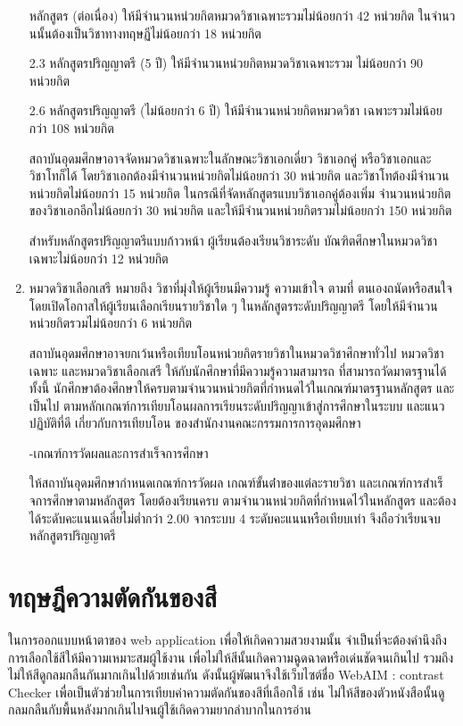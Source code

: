 \begin{enumerate}
    หลักสูตร (ต่อเนื่อง) ให้มีจํานวนหน่วยกิตหมวดวิชาเฉพาะรวมไม่น้อยกว่า 42 หน่วยกิต ในจํานวนนั้นต้องเป็นวิชาทางทฤษฏีไม่น้อยกว่า 18 หน่วยกิต

    2.3	หลักสูตรปริญญาตรี (5 ปี) ให้มีจํานวนหน่วยกิตหมวดวิชาเฉพาะรวม ไม่น้อยกว่า 90 หน่วยกิต

    2.6 หลักสูตรปริญญาตรี (ไม่น้อยกว่า 6 ปี) ให้มีจํานวนหน่วยกิตหมวดวิชา เฉพาะรวมไม่น้อยกว่า 108 หน่วยกิต

    สถาบันอุดมศึกษาอาจจัดหมวดวิชาเฉพาะในลักษณะวิชาเอกเดี่ยว วิชาเอกคู่ หรือวิชาเอกและวิชาโทก็ได้ โดยวิชาเอกต้องมีจํานวนหน่วยกิตไม่น้อยกว่า 30 หน่วยกิต และวิชาโทต้องมีจํานวนหน่วยกิตไม่น้อยกว่า 15 หน่วยกิต ในกรณีที่จัดหลักสูตรแบบวิชาเอกคู่ต้องเพิ่ม จํานวนหน่วยกิตของวิชาเอกอีกไม่น้อยกว่า 30 หน่วยกิต และให้มีจํานวนหน่วยกิตรวมไม่น้อยกว่า 150 หน่วยกิต
		
    สําหรับหลักสูตรปริญญาตรีแบบก้าวหน้า ผู้เรียนต้องเรียนวิชาระดับ บัณฑิตศึกษาในหมวดวิชาเฉพาะไม่น้อยกว่า 12 หน่วยกิต 




    \item หมวดวิชาเลือกเสรี หมายถึง วิชาที่มุ่งให้ผู้เรียนมีความรู้ ความเข้าใจ ตามที่ ตนเองถนัดหรือสนใจ โดยเปิดโอกาสให้ผู้เรียนเลือกเรียนรายวิชาใด ๆ ในหลักสูตรระดับปริญญาตรี โดยให้มีจํานวนหน่วยกิตรวมไม่น้อยกว่า 6 หน่วยกิต
   
    สถาบันอุดมศึกษาอาจยกเว้นหรือเทียบโอนหน่วยกิตรายวิชาในหมวดวิชาศึกษาทั่วไป หมวดวิชาเฉพาะ และหมวดวิชาเลือกเสรี ให้กับนักศึกษาที่มีความรู้ความสามารถ ที่สามารถวัดมาตรฐานได้ ทั้งนี้ นักศึกษาต้องศึกษาให้ครบตามจํานวนหน่วยกิตที่กําหนดไว้ในเกณฑ์มาตรฐานหลักสูตร และเป็นไป ตามหลักเกณฑ์การเทียบโอนผลการเรียนระดับปริญญาเข้าสู่การศึกษาในระบบ และแนวปฏิบัติที่ดี เกี่ยวกับการเทียบโอน ของสํานักงานคณะกรรมการการอุดมศึกษา
  


-เกณฑ์การวัดผลและการสําเร็จการศึกษา

ให้สถาบันอุดมศึกษากําหนดเกณฑ์การวัดผล เกณฑ์ขั้นต่ําของแต่ละรายวิชา และเกณฑ์การสําเร็จการศึกษาตามหลักสูตร โดยต้องเรียนครบ ตามจํานวนหน่วยกิตที่กําหนดไว้ในหลักสูตร และต้องได้ระดับคะแนนเฉลี่ยไม่ตํ่ากว่า 2.00 จากระบบ 4 ระดับคะแนนหรือเทียบเท่า จึงถือว่าเรียนจบหลักสูตรปริญญาตรี 


\end{enumerate}

\section{ทฤษฎีความตัดกันของสี}

ในการออกแบบหน้าตาของ web application เพื่อให้เกิดความสวยงามนั้น จำเป็นที่จะต้องคำนึงถึงการเลือกใช้สีให้มีความเหมาะสมผู้ใช้งาน เพื่อไม่ให้สีนั้นเกิดความฉูดฉาดหรือเด่นชัดจนเกินไป รวมถึงไม่ให้สีดูกลมกลืนกันมากเกินไปด้วยเช่นกัน ดังนั้นผู้พัฒนาจึงใช้เว็บไซต์ชื่อ WebAIM : contrast Checker เพื่อเป็นตัวช่วยในการเทียบค่าความตัดกันของสีที่เลือกใช้ เช่น ไม่ให้สีของตัวหนังสือนั้นดูกลมกลืนกับพื้นหลังมากเกินไปจนผู้ใช้เกิดความยากลำบากในการอ่าน


